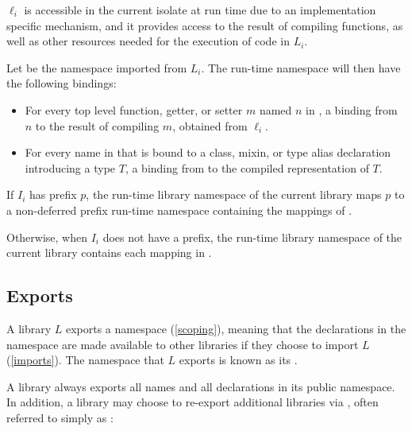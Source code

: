 \documentclass[makeidx]{article}
\begin{document}
{\LMHash{}%
$\ell_i$ is accessible in the current isolate at run time
due to an implementation specific mechanism,
and it provides access to the result of compiling functions,
as well as other resources needed for the execution of code in $L_i$.

\LMHash{}%
Let  be the namespace imported from $L_i$.
The run-time namespace  will then have the following bindings:

\begin{itemize}
\item
  For every top level function, getter, or setter $m$ named $n$ in
  ,
  a binding from $n$ to the result of compiling $m$,
  obtained from $\ell_i$.
\item
  For every name \id{} in 
  that is bound to a class, mixin, or type alias declaration
  introducing a type $T$,
  a binding from \id{} to the compiled representation of $T$.
\end{itemize}

\LMHash{}%
If $I_i$ has prefix $p$,
the run-time library namespace of the current library
maps $p$ to a non-deferred prefix run-time namespace 
containing the mappings of .


\LMHash{}%
Otherwise, when $I_i$ does not have a prefix,
the run-time library namespace of the current library
contains each mapping in .
\EndCase


\subsection{Exports}

\LMHash{}%
A library $L$ exports a namespace (\ref{scoping}), meaning that
the declarations in the namespace are made available to other libraries
if they choose to import $L$ (\ref{imports}).
The namespace that $L$ exports is known as its
.

\LMHash{}%
A library always exports all names and all declarations in its public namespace.
In addition, a library may choose to re-export additional libraries
via , often referred to simply as :

}
\end{document}
